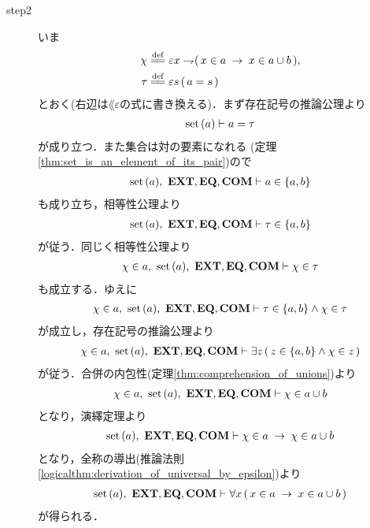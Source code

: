 \begin{sketch}
\begin{description}
			\item[step2]
				いま
				\begin{align}
					\chi &\defeq \varepsilon x \negation (\, x \in a \rarrow x \in a \cup b\, ), \\
					\tau &\defeq \varepsilon s\, (\, a = s\, )
				\end{align}
				とおく(右辺は$\lang{\varepsilon}$の式に書き換える)．まず存在記号の推論公理より
				\begin{align}
					\operatorname*{set}\hspace{0.15em}(a) \vdash a = \tau
				\end{align}
				が成り立つ．また集合は対の要素になれる
				(定理\ref{thm:set_is_an_element_of_its_pair})ので
				\begin{align}
					\operatorname*{set}\hspace{0.15em}(a),\ \mbox{{\bf EXT}},\mbox{{\bf EQ}},\mbox{\bf COM} \vdash a \in \{a,b\}
				\end{align}
				も成り立ち，相等性公理より
				\begin{align}
					\operatorname*{set}\hspace{0.15em}(a),\ \mbox{{\bf EXT}},\mbox{{\bf EQ}},\mbox{\bf COM} \vdash \tau \in \{a,b\}
				\end{align}
				が従う．同じく相等性公理より
				\begin{align}
					\chi \in a,\ \operatorname*{set}\hspace{0.15em}(a),\ \mbox{{\bf EXT}},\mbox{{\bf EQ}},\mbox{\bf COM} \vdash \chi \in \tau
				\end{align}
				も成立する．ゆえに
				\begin{align}
					\chi \in a,\ \operatorname*{set}\hspace{0.15em}(a),\ \mbox{{\bf EXT}},\mbox{{\bf EQ}},\mbox{\bf COM} \vdash 
					\tau \in \{a,b\} \wedge \chi \in \tau
				\end{align}
				が成立し，存在記号の推論公理より
				\begin{align}
					\chi \in a,\ \operatorname*{set}\hspace{0.15em}(a),\ \mbox{{\bf EXT}},\mbox{{\bf EQ}},\mbox{\bf COM} \vdash 
					\exists z\, (\, z \in \{a,b\} \wedge \chi \in z\, )
				\end{align}
				が従う．合併の内包性(定理\ref{thm:comprehension_of_unions})より
				\begin{align}
					\chi \in a,\ \operatorname*{set}\hspace{0.15em}(a),\ \mbox{{\bf EXT}},\mbox{{\bf EQ}},\mbox{\bf COM} \vdash 
					\chi \in a \cup b
				\end{align}
				となり，演繹定理より
				\begin{align}
					\operatorname*{set}\hspace{0.15em}(a),\ \mbox{{\bf EXT}},\mbox{{\bf EQ}},\mbox{\bf COM} \vdash 
					\chi \in a \hspace{0.25em}\rightarrow\hspace{0.25em} \chi \in a \cup b
				\end{align}
				となり，全称の導出(推論法則\ref{logicalthm:derivation_of_universal_by_epsilon})より
				\begin{align}
					\operatorname*{set}\hspace{0.15em}(a),\ \mbox{{\bf EXT}},\mbox{{\bf EQ}},\mbox{\bf COM} \vdash 
					\forall x\, (\, x \in a \hspace{0.25em}\rightarrow\hspace{0.25em} x \in a \cup b\, )
				\end{align}
				が得られる．
				\QED
		\end{description}
	\end{sketch}
	
